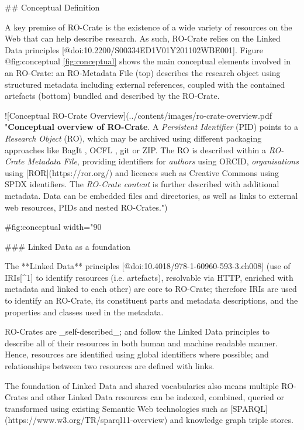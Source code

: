 ## Conceptual Definition

A key premise of RO-Crate is the existence of a wide variety of resources on the Web that can help describe research. As such, RO-Crate relies on the Linked Data principles [@doi:10.2200/S00334ED1V01Y201102WBE001]. Figure {@fig:conceptual} \ref{fig:conceptual} shows the main conceptual elements involved in an RO-Crate: an RO-Metadata File (top) describes the research object using structured metadata including external references, coupled with the contained artefacts (bottom) bundled and described by the RO-Crate.

![Conceptual RO-Crate Overview](../content/images/ro-crate-overview.pdf "\textbf{Conceptual overview of RO-Crate}. A \emph{Persistent Identifier} (PID) \cite{doi:10.1371/journal.pbio.2001414} points to a \emph{Research Object} (RO), which may be archived using different packaging approaches like BagIt \cite{doi:10.17487/rfc8493}, OCFL \cite{ocfl_2020}, git or ZIP. The RO is described within a \emph{RO-Crate Metadata File}, providing identifiers for \emph{authors} using ORCID, \emph{organisations} using [ROR](https://ror.org/) and licences such as Creative Commons using SPDX identifiers. The \emph{RO-Crate content} is further described with additional metadata. Data can be embedded files and directories, as well as links to external web resources, PIDs and nested RO-Crates."){#fig:conceptual width="90%

### Linked Data as a foundation

The **Linked Data** principles [@doi:10.4018/978-1-60960-593-3.ch008] (use of IRIs[^1] to identify resources (i.e. artefacts), resolvable via HTTP, enriched with metadata and linked to each other) are core to RO-Crate; therefore IRIs are used to identify an RO-Crate, its constituent parts and metadata descriptions, and the properties and classes used in the metadata. 

RO-Crates are _self-described_; and follow the Linked Data principles to describe all of their resources in both human and machine readable manner.  Hence, resources are identified using global identifiers where possible; and relationships between two resources are defined with links.

The foundation of Linked Data and shared vocabularies also means multiple RO-Crates and other Linked Data resources can be indexed, combined, queried or transformed using existing Semantic Web technologies such as [SPARQL](https://www.w3.org/TR/sparql11-overview) and knowledge graph triple stores.

}
